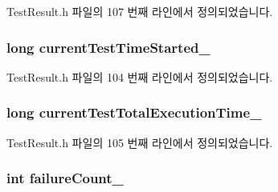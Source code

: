 Test\+Result.\+h 파일의 107 번째 라인에서 정의되었습니다.

\subsubsection[{\texorpdfstring{current\+Test\+Time\+Started\+\_\+}{currentTestTimeStarted_}}]{\setlength{\rightskip}{0pt plus 5cm}long current\+Test\+Time\+Started\+\_\+\hspace{0.3cm}{\ttfamily [private]}}\hypertarget{class_test_result_a436d2703869b654578b90237c2e7b6b7}{}\label{class_test_result_a436d2703869b654578b90237c2e7b6b7}


Test\+Result.\+h 파일의 104 번째 라인에서 정의되었습니다.

\subsubsection[{\texorpdfstring{current\+Test\+Total\+Execution\+Time\+\_\+}{currentTestTotalExecutionTime_}}]{\setlength{\rightskip}{0pt plus 5cm}long current\+Test\+Total\+Execution\+Time\+\_\+\hspace{0.3cm}{\ttfamily [private]}}\hypertarget{class_test_result_a760d835a5174afcf6c0d1a08d2a75124}{}\label{class_test_result_a760d835a5174afcf6c0d1a08d2a75124}


Test\+Result.\+h 파일의 105 번째 라인에서 정의되었습니다.

\subsubsection[{\texorpdfstring{failure\+Count\+\_\+}{failureCount_}}]{\setlength{\rightskip}{0pt plus 5cm}int failure\+Count\+\_\+\hspace{0.3cm}{\ttfamily [private]}}\hypertarget{class_test_result_a006a6550e4e3d4de173c35b50c1c90b0}{}\label{class_test_result_a006a6550e4e3d4de173c35b50c1c90b0}


